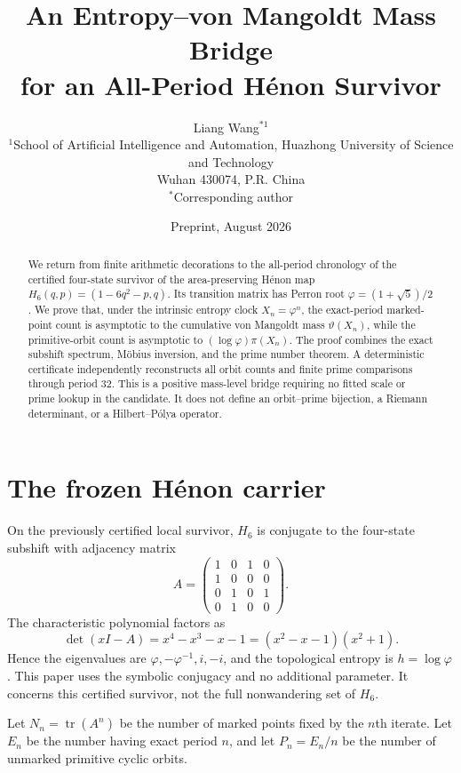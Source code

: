 \documentclass[11pt]{article}
\title{An Entropy--von Mangoldt Mass Bridge\\for an All-Period H\'enon Survivor}
\author{Liang Wang$^{*1}$\\
\small $^{1}$School of Artificial Intelligence and Automation, Huazhong University of Science and Technology\\
\small Wuhan 430074, P.R. China\\
\small $^*$Corresponding author}
\date{Preprint, August 2026}
\theoremstyle{remark}\newtheorem{remark}[theorem]{Remark}
\begin{document}
\maketitle
\begin{abstract}
We return from finite arithmetic decorations to the all-period chronology of
the certified four-state survivor of the area-preserving H\'enon map
$H_6(q,p)=(1-6q^2-p,q)$.  Its transition matrix has Perron root
$\varphi=(1+\sqrt5)/2$.  We prove that, under the intrinsic entropy clock
$X_n=\varphi^n$, the exact-period marked-point count is asymptotic to the
cumulative von Mangoldt mass $\vartheta(X_n)$, while the primitive-orbit
count is asymptotic to $(\log\varphi)\pi(X_n)$.  The proof combines the exact
subshift spectrum, M\"obius inversion, and the prime number theorem.  A
deterministic certificate independently reconstructs all orbit counts and
finite prime comparisons through period 32.  This is a positive mass-level
bridge requiring no fitted scale or prime lookup in the candidate.  It does
not define an orbit--prime bijection, a Riemann determinant, or a
Hilbert--P\'olya operator.
\end{abstract}

\section{The frozen H\'enon carrier}
On the previously certified local survivor, $H_6$ is conjugate to the
four-state subshift with adjacency matrix
\[
A=\begin{pmatrix}
1&0&1&0\\1&0&0&0\\0&1&0&1\\0&1&0&0
\end{pmatrix}.
\]
The characteristic polynomial factors as
\[
\det(xI-A)=x^4-x^3-x-1=(x^2-x-1)(x^2+1).
\]
Hence the eigenvalues are $\varphi,-\varphi^{-1},i,-i$, and the
topological entropy is $h=\log\varphi$.  This paper uses the symbolic
conjugacy and no additional parameter.  It concerns this certified survivor,
not the full nonwandering set of $H_6$.

Let $N_n=\operatorname{tr}(A^n)$ be the number of marked points fixed by
the $n$th iterate.  Let $E_n$ be the number having exact period $n$, and let
$P_n=E_n/n$ be the number of unmarked primitive cyclic orbits.
\end{document}
